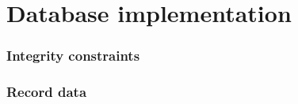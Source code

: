 \section{Database implementation}
\subsubsection{Integrity constraints}
\subsubsection{Record data}

